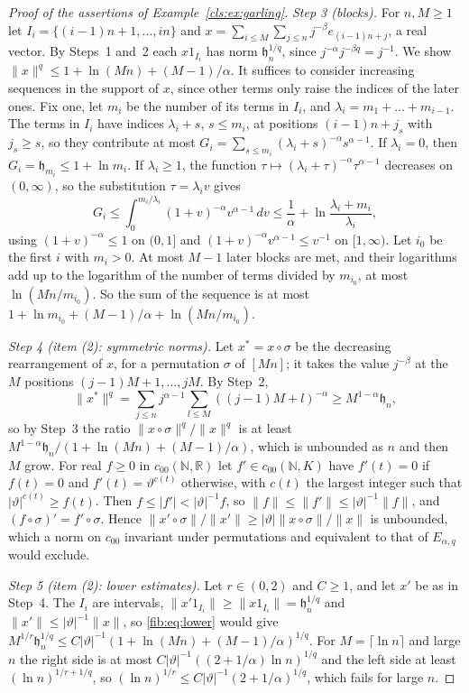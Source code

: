 \documentclass[11pt]{amsart}
\theoremstyle{definition}
\theoremstyle{remark}
\numberwithin{equation}{section}
\newcommand{\N}{\mathbb N}
\newcommand{\abs}[1]{\lvert #1\rvert}
\newcommand{\norm}[1]{\lVert #1\rVert}
\theoremstyle{plain}
\theoremstyle{definition}
\theoremstyle{plain}
\begin{document}
\begin{proof}[Proof of the assertions of Example~\ref{cls:ex:garling}]
\emph{Step 3 (blocks).} For $n,M\ge1$ let $I_i=\{(i-1)n+1,\dots,in\}$ and
$x=\sum_{i\le M}\sum_{j\le n}j^{-\beta}e_{(i-1)n+j}$, a real vector. By Steps~1 and~2 each $x1_{I_i}$ has norm $\mathfrak
h_n^{1/q}$, since $j^{-\alpha}j^{-\beta q}=j^{-1}$. We show $\norm x^q\le1+\ln(Mn)+(M-1)/\alpha$. It suffices to consider
increasing sequences in the support of $x$, since other terms only raise the indices of the later ones. Fix one, let
$m_i$ be the number of its terms in $I_i$, and $\lambda_i=m_1+\dots+m_{i-1}$. The terms in $I_i$ have indices
$\lambda_i+s$, $s\le m_i$, at positions $(i-1)n+j_s$ with $j_s\ge s$, so they contribute at most
$G_i=\sum_{s\le m_i}(\lambda_i+s)^{-\alpha}s^{\alpha-1}$. If $\lambda_i=0$, then $G_i=\mathfrak h_{m_i}\le1+\ln m_i$. If
$\lambda_i\ge1$, the function $\tau\mapsto(\lambda_i+\tau)^{-\alpha}\tau^{\alpha-1}$ decreases on $(0,\infty)$, so the
substitution $\tau=\lambda_iv$ gives
\[
 G_i\le\int_0^{m_i/\lambda_i}(1+v)^{-\alpha}v^{\alpha-1}\,dv\le\frac1\alpha+\ln\frac{\lambda_i+m_i}{\lambda_i},
\]
using $(1+v)^{-\alpha}\le1$ on $(0,1]$ and $(1+v)^{-\alpha}v^{\alpha-1}\le v^{-1}$ on $[1,\infty)$. Let $i_0$ be the first
$i$ with $m_i>0$. At most $M-1$ later blocks are met, and their logarithms add up to the logarithm of the number of
terms divided by $m_{i_0}$, at most $\ln(Mn/m_{i_0})$. So the sum of the sequence is at most
$1+\ln m_{i_0}+(M-1)/\alpha+\ln(Mn/m_{i_0})$.

\emph{Step 4 (item (2): symmetric norms).} Let $x^*=x\circ\sigma$ be the decreasing rearrangement of $x$, for a
permutation $\sigma$ of $[Mn]$; it takes the value $j^{-\beta}$ at the $M$ positions $(j-1)M+1,\dots,jM$. By Step~2,
\[
 \norm{x^*}^q=\sum_{j\le n}j^{\alpha-1}\sum_{l\le M}((j-1)M+l)^{-\alpha}\ge M^{1-\alpha}\mathfrak h_n,
\]
so by Step~3 the ratio $\norm{x\circ\sigma}^q/\norm x^q$ is at least $M^{1-\alpha}\mathfrak h_n/(1+\ln(Mn)+(M-1)/\alpha)$,
which is unbounded as $n$ and then $M$ grow. For real $f\ge0$ in $c_{00}(\N,\mathbb R)$ let $f'\in c_{00}(\N,K)$ have
$f'(t)=0$ if $f(t)=0$ and $f'(t)=\vartheta^{c(t)}$ otherwise, with $c(t)$ the largest integer such that
$\abs\vartheta^{c(t)}\ge f(t)$. Then $f\le\abs{f'}<\abs\vartheta^{-1}f$, so $\norm f\le\norm{f'}\le\abs\vartheta^{-1}\norm f$,
and $(f\circ\sigma)'=f'\circ\sigma$. Hence $\norm{x'\circ\sigma}/\norm{x'}\ge\abs\vartheta\norm{x\circ\sigma}/\norm x$ is
unbounded, which a norm on $c_{00}$ invariant under permutations and equivalent to that of $E_{\alpha,q}$ would exclude.

\emph{Step 5 (item (2): lower estimates).} Let $r\in(0,2)$ and $C\ge1$, and let $x'$ be as in Step~4. The $I_i$ are
intervals, $\norm{x'1_{I_i}}\ge\norm{x1_{I_i}}=\mathfrak h_n^{1/q}$ and $\norm{x'}\le\abs\vartheta^{-1}\norm x$, so
\eqref{fib:eq:lower} would give $M^{1/r}\mathfrak h_n^{1/q}\le C\abs\vartheta^{-1}(1+\ln(Mn)+(M-1)/\alpha)^{1/q}$. For
$M=\lceil\ln n\rceil$ and large $n$ the right side is at most $C\abs\vartheta^{-1}((2+1/\alpha)\ln n)^{1/q}$ and the left
side at least $(\ln n)^{1/r+1/q}$, so $(\ln n)^{1/r}\le C\abs\vartheta^{-1}(2+1/\alpha)^{1/q}$, which fails for large $n$.


\end{proof}
\end{document}
